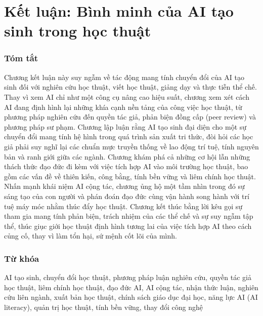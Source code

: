 \chapter*{Kết luận: Bình minh của AI tạo sinh trong học thuật}

\subsection{Tóm tắt}

Chương kết luận này suy ngẫm về tác động mang tính chuyển đổi của AI tạo sinh đối với nghiên cứu học thuật, viết học thuật, giảng dạy và thực tiễn thể chế. Thay vì xem AI chỉ như một công cụ nâng cao hiệu suất, chương xem xét cách AI đang định hình lại những khía cạnh nền tảng của công việc học thuật, từ phương pháp nghiên cứu đến quyền tác giả, phản biện đồng cấp (peer review) và phương pháp sư phạm. Chương lập luận rằng AI tạo sinh đại diện cho một sự chuyển đổi mang tính hệ hình trong quá trình sản xuất tri thức, đòi hỏi các học giả phải suy nghĩ lại các chuẩn mực truyền thống về lao động trí tuệ, tính nguyên bản và ranh giới giữa các ngành. Chương khám phá cả những cơ hội lẫn những thách thức đạo đức đi kèm với việc tích hợp AI vào môi trường học thuật, bao gồm các vấn đề về thiên kiến, công bằng, tính bền vững và liêm chính học thuật. Nhấn mạnh khái niệm AI cộng tác, chương ủng hộ một tầm nhìn trong đó sự sáng tạo của con người và phán đoán đạo đức cùng vận hành song hành với trí tuệ máy móc nhằm thúc đẩy học thuật. Chương kết thúc bằng lời kêu gọi sự tham gia mang tính phản biện, trách nhiệm của các thể chế và sự suy ngẫm tập thể, thúc giục giới học thuật định hình tương lai của việc tích hợp AI theo cách củng cố, thay vì làm tổn hại, sứ mệnh cốt lõi của mình.

\subsection{Từ khóa}

AI tạo sinh, chuyển đổi học thuật, phương pháp luận nghiên cứu, quyền tác giả học thuật, liêm chính học thuật, đạo đức AI, AI cộng tác, nhận thức luận, nghiên cứu liên ngành, xuất bản học thuật, chính sách giáo dục đại học, năng lực AI (AI literacy), quản trị học thuật, tính bền vững, thay đổi công nghệ

